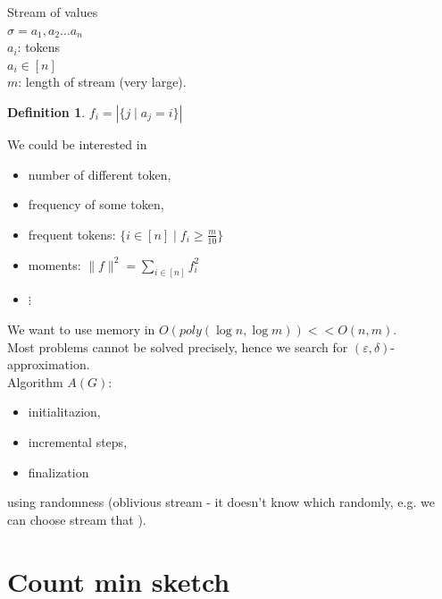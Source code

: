 \documentclass[a4paper, 12pt]{book}
\theoremstyle{definition}
\newtheorem{defn}[counter]{Definition}
\theoremstyle{remark}
\begin{document}
Stream of values \\
$\sigma = a_1, a_2 \dots a_n$ \\
$a_i$: tokens \\
$a_i \in [n]$ \\
$m$: length of stream (very large).
\begin{defn}
  $f_i = \left| \{j \mid a_j = i\} \right|$
\end{defn}
We could be interested in
\begin{itemize}
  \item number of different token,
  \item frequency of some token,
  \item frequent tokens: $\{i \in [n] \mid f_i \geq \frac{m}{10}\}$
  \item moments: $\lVert f \rVert^2 = \sum_{i \in [n]} f_i^2$
  \item $\vdots$
\end{itemize}
We want to use memory in $O(poly(\log n, \log m)) << O(n, m)$. \\
Most problems cannot be solved precisely, hence we search for $(\varepsilon, \delta)$-approximation. \\
Algorithm $A(G)$:
\begin{itemize}
  \item initialitazion,
  \item incremental steps,
  \item finalization
\end{itemize}
using randomness (oblivious stream - it doesn't know which randomly,
e.g. we can choose stream that ).


\section{Count min sketch}
\end{document}

